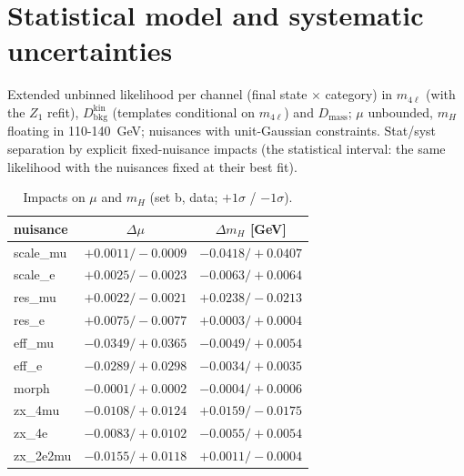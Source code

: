 \documentclass[11pt,a4paper]{article}
\begin{document}
\section{Statistical model and systematic uncertainties}
Extended unbinned likelihood per channel (final state $\times$ category) in $m_{4\ell}$ (with the $Z_1$ refit),
$D_{\text{bkg}}^{\text{kin}}$ (templates conditional on $m_{4\ell}$) and $D_{\text{mass}}$; $\mu$ unbounded, $m_H$
floating in 110-140~GeV; nuisances with unit-Gaussian constraints.  Stat/syst separation by explicit fixed-nuisance
impacts (the statistical interval: the same likelihood with the nuisances fixed at their best fit).
\begin{table}[H]\centering\small\caption{Impacts on $\mu$ and $m_H$ (set b, data; $+1\sigma$ / $-1\sigma$).}\begin{tabular}{lcc}\toprule nuisance & $\Delta\mu$ & $\Delta m_H$ [GeV]\\\midrule
scale\_mu & $+0.0011/-0.0009$ & $-0.0418/+0.0407$\\
scale\_e & $+0.0025/-0.0023$ & $-0.0063/+0.0064$\\
res\_mu & $+0.0022/-0.0021$ & $+0.0238/-0.0213$\\
res\_e & $+0.0075/-0.0077$ & $+0.0003/+0.0004$\\
eff\_mu & $-0.0349/+0.0365$ & $-0.0049/+0.0054$\\
eff\_e & $-0.0289/+0.0298$ & $-0.0034/+0.0035$\\
morph & $-0.0001/+0.0002$ & $-0.0004/+0.0006$\\
zx\_4mu & $-0.0108/+0.0124$ & $+0.0159/-0.0175$\\
zx\_4e & $-0.0083/+0.0102$ & $-0.0055/+0.0054$\\
zx\_2e2mu & $-0.0155/+0.0118$ & $+0.0011/-0.0004$\\
\bottomrule\end{tabular}\end{table}
\end{document}
